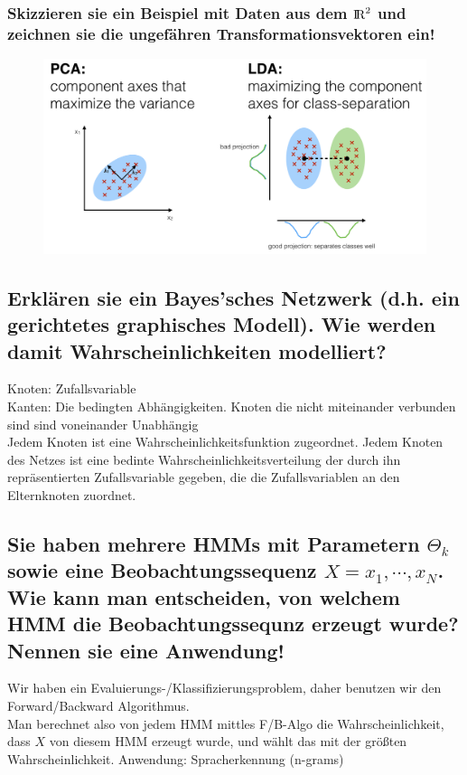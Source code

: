 \documentclass[12pt]{scrartcl}
\begin{document}
\subsubsection{Skizzieren sie ein Beispiel mit Daten aus dem ${\rm I\!R}^2$ und zeichnen sie die ungefähren Transformationsvektoren ein!}
\begin{figure}[htb]
  \begin{center}
  \includegraphics[scale=0.35]{pcalda}
  \end{center}
  \vspace{-\baselineskip}
\end{figure}

\subsection{Erklären sie ein Bayes'sches Netzwerk (d.h. ein gerichtetes graphisches Modell). Wie werden damit Wahrscheinlichkeiten modelliert?}

Knoten: Zufallsvariable \\
Kanten: Die bedingten Abhängigkeiten. Knoten die nicht miteinander verbunden sind sind voneinander Unabhängig \\
Jedem Knoten ist eine Wahrscheinlichkeitsfunktion zugeordnet. Jedem Knoten des Netzes ist eine bedinte Wahrscheinlichkeitsverteilung der durch ihn repräsentierten Zufallsvariable gegeben, die die Zufallsvariablen an den Elternknoten zuordnet.

\subsection{Sie haben mehrere HMMs mit Parametern $\Theta_k$ sowie eine Beobachtungssequenz $X = x_1, \cdots , x_N$. Wie kann man entscheiden, von welchem HMM die Beobachtungssequnz erzeugt wurde? Nennen sie eine Anwendung!}
Wir haben ein Evaluierungs-/Klassifizierungsproblem, daher benutzen wir den Forward/Backward Algorithmus. \\
Man berechnet also von jedem HMM mittles F/B-Algo die Wahrscheinlichkeit, dass $X$ von diesem HMM erzeugt wurde, und wählt das mit der größten Wahrscheinlichkeit. Anwendung: Spracherkennung (n-grams) \\
\end{document}
